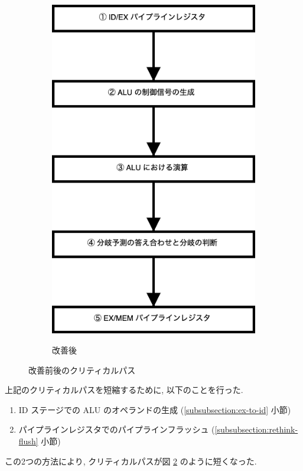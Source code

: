 \documentclass[../improvements.tex]{subfiles}
\begin{document}
\begin{figure}[h]
\begin{subfigure}{\columnwidth}
{        \includegraphics{../../images/critical_path_after.png}
      }
      \caption{改善後}
      \label{fig:critical-path-after}
    \end{subfigure}
    \caption{改善前後のクリティカルパス}
  \end{figure}

  上記のクリティカルパスを短縮するために, 以下のことを行った.
  \begin{enumerate}
    \item ID ステージでの ALU のオペランドの生成 (\ref{subsubsection:ex-to-id} 小節)
    \item パイプラインレジスタでのパイプラインフラッシュ (\ref{subsubsection:rethink-flush} 小節)
  \end{enumerate}
  この2つの方法により, クリティカルパスが図 \ref{fig:critical-path-after} のように短くなった.
\end{document}
